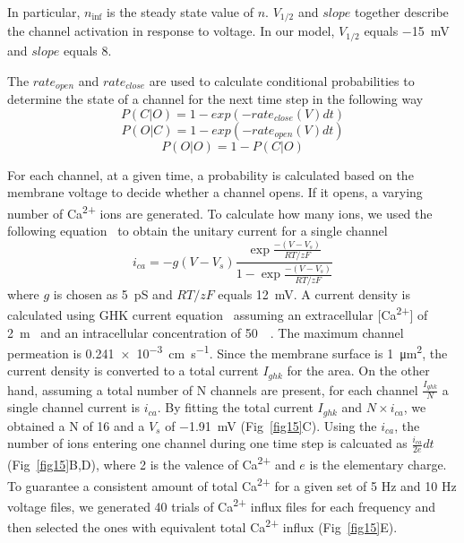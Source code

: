 \documentclass[10pt,letterpaper]{article}
\begin{document}
In particular, $n_{\inf}$ is the steady state value of $n$. $V_{1/2}$ and $slope$ together describe the channel activation in response to voltage. In our model, $V_{1/2}$ equals \SI{-15}{\mV} and $slope$ equals 8.

The $rate_{open}$ and $rate_{close}$ are used to calculate conditional probabilities to determine the state of a channel for the next time step in the following way
\begin{equation}P(C|O)=1-exp(-rate_{close}(V)dt)\end{equation}
\begin{equation}P(O|C)=1-exp(-rate_{open}(V)dt)\end{equation}
\begin{equation}P(O|O)=1-P(C|O)\end{equation}

For each channel, at a given time, a probability is calculated based on the membrane voltage to decide whether a channel opens. If it opens, a varying number of Ca\textsuperscript{2+} ions are generated. To calculate how many ions, we used the following equation~\cite{2013PNAS..11015794T} to obtain the unitary current for a single channel
\begin{equation}i_{ca}=-g(V-V_s)\frac{\exp\frac{-(V-V_s)}{RT/zF}}{1-\exp\frac{-(V-V_s)}{RT/zF}}\end{equation}
where $g$ is chosen as \SI{5}{\pico\siemens} and $RT/zF$ equals \SI{12}{\milli\volt}. A current density is calculated using GHK current equation~\cite{citeulike:306134} assuming an extracellular [Ca\textsuperscript{2+}] of \SI{2}{\m\Molar} and an intracellular concentration of \SI{50}{\nano\Molar}. The maximum channel permeation is \SI{0.241e-3}{\cm\per\s}. Since the membrane surface is \SI{1}{\square\um}, the current density is converted to a total current $I_{ghk}$ for the area. On the other hand, assuming a total number of N channels are present, for each channel $\frac{I_{ghk}}{N}$ a single channel current is $i_{ca}$. By fitting the total current $I_{ghk}$ and $N\times i_{ca}$, we obtained a N of 16 and a $V_s$ of \SI{-1.91}{\milli\volt} (Fig~\ref{fig15}C). Using the $i_{ca}$, the number of ions entering one channel during one time step is calcuated as $\frac{i_{ca}}{2e}dt$ (Fig~\ref{fig15}B,D), where 2 is the valence of Ca\textsuperscript{2+} and $e$ is the elementary charge. To guarantee a consistent amount of total Ca\textsuperscript{2+} for a given set of 5 Hz and 10 Hz voltage files, we generated 40 trials of Ca\textsuperscript{2+} influx files for each frequency and then selected the ones with equivalent total Ca\textsuperscript{2+} influx (Fig~\ref{fig15}E).
\end{document}
